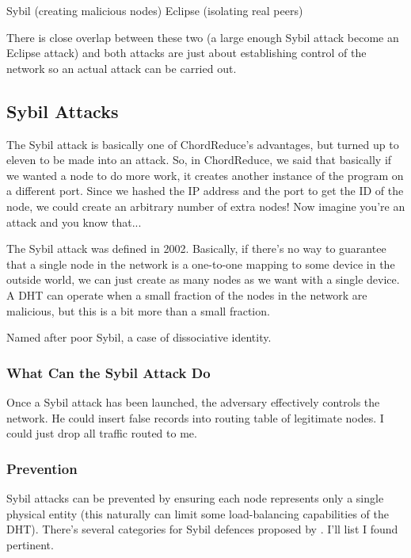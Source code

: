\documentclass[10pt,letterpaper]{report}
\begin{document}
Sybil (creating malicious nodes)
Eclipse (isolating real peers)

There is close overlap between these two (a large enough Sybil attack become an Eclipse attack) and both attacks are just about establishing control of the network so an actual attack can be carried out.




\subsection{Sybil Attacks}
The Sybil attack is basically one of ChordReduce's advantages, but turned up to eleven to be made into an attack.  So, in ChordReduce, we said that basically if we wanted a node to do more work,  it creates another instance of the program on a different port.  Since we hashed the IP address and the port to get the ID of the node, we could create an arbitrary number of extra nodes!  Now imagine you're an attack and you know that...

The Sybil attack was defined in 2002.  Basically,  if there's no way to guarantee that a single node in the network is a one-to-one mapping to some device in the outside world, we can just create as many nodes as we want with a single device.  A DHT can operate when a small fraction of the nodes in the network are malicious, but this is a bit more than a small fraction.  

Named after poor Sybil, a case of dissociative identity.

\subsubsection{What Can the Sybil Attack Do}
Once a Sybil attack has been launched,  the adversary effectively controls the network.   He could insert false records into routing table of legitimate nodes.  I could just drop all traffic routed to me.

\subsubsection{Prevention}


Sybil attacks can be prevented by ensuring each node represents only a single physical entity (this naturally can limit some load-balancing capabilities of the DHT). There's several categories for Sybil defences proposed by \cite{dhtsec}.  I'll list I found pertinent.
\end{document}
